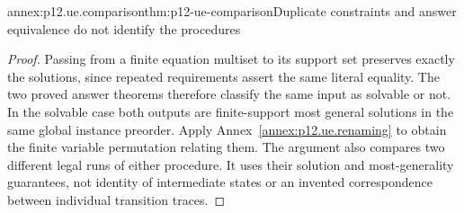 \begin{annexitem}{annex:p12.ue.comparison}{thm:p12-ue-comparison}{Duplicate constraints and answer equivalence do not identify the procedures}
\begin{proof}
Passing from a finite equation multiset to its support set preserves
exactly the solutions, since repeated requirements assert the same
literal equality. The two proved answer theorems therefore classify
the same input as solvable or not. In the solvable case both outputs
are finite-support most general solutions in the same global instance
preorder. Apply Annex~\ref{annex:p12.ue.renaming} to obtain the finite
variable permutation relating them. The argument also compares two
different legal runs of either procedure. It uses their solution and
most-generality guarantees, not identity of intermediate states or
an invented correspondence between individual transition traces.
\end{proof}
\end{annexitem}
